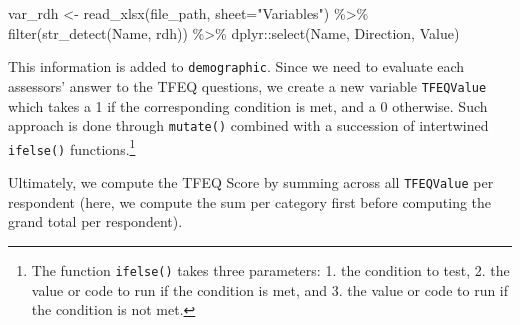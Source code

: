 \documentclass[
]{book}
\newenvironment{Shaded}{\begin{snugshade}}{\end{snugshade}}
\newcommand{\AttributeTok}[1]{\textcolor[rgb]{0.77,0.63,0.00}{#1}}
\newcommand{\FunctionTok}[1]{\textcolor[rgb]{0.00,0.00,0.00}{#1}}
\newcommand{\NormalTok}[1]{#1}
\newcommand{\OtherTok}[1]{\textcolor[rgb]{0.56,0.35,0.01}{#1}}
\newcommand{\SpecialCharTok}[1]{\textcolor[rgb]{0.00,0.00,0.00}{#1}}
\newcommand{\StringTok}[1]{\textcolor[rgb]{0.31,0.60,0.02}{#1}}
\begin{document}
\begin{Shaded}
\begin{Highlighting}[]
\NormalTok{var\_rdh }\OtherTok{\textless{}{-}} \FunctionTok{read\_xlsx}\NormalTok{(file\_path, }\AttributeTok{sheet=}\StringTok{"Variables"}\NormalTok{) }\SpecialCharTok{\%\textgreater{}\%} 
  \FunctionTok{filter}\NormalTok{(}\FunctionTok{str\_detect}\NormalTok{(Name, rdh)) }\SpecialCharTok{\%\textgreater{}\%} 
\NormalTok{  dplyr}\SpecialCharTok{::}\FunctionTok{select}\NormalTok{(Name, Direction, Value)}
\end{Highlighting}
\end{Shaded}

This information is added to \texttt{demographic}. Since we need to evaluate each assessors' answer to the TFEQ questions, we create a new variable \texttt{TFEQValue} which takes a 1 if the corresponding condition is met, and a 0 otherwise. Such approach is done through \texttt{mutate()} combined with a succession of intertwined \texttt{ifelse()} functions.\footnote{The function \texttt{ifelse()} takes three parameters: 1. the condition to test, 2. the value or code to run if the condition is met, and 3. the value or code to run if the condition is not met.}

Ultimately, we compute the TFEQ Score by summing across all \texttt{TFEQValue} per respondent (here, we compute the sum per category first before computing the grand total per respondent).
\end{document}
